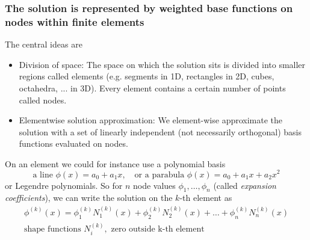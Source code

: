\subsubsection{The solution is represented by weighted base functions on nodes within finite elements}
The central ideas are
\begin{itemize}
    \item \textcolor{blue1}{Division of space:} The space on which the solution sits is divided into smaller regions called elements (e.g. segments in 1D, rectangles in 2D, cubes, octahedra, ... in 3D).  Every element contains a certain number of points called nodes.
    \item \textcolor{blue1}{Elementwise solution approximation:} We element-wise approximate the solution with a set of linearly independent (not necessarily orthogonal) basis functions evaluated on nodes.
\end{itemize}
On an element we could for instance use a polynomial basis
\begin{equation}
    \text{a line } \phi(x) = a_0 + a_1 x, \quad \text{or a parabula } \phi(x) = a_0 + a_1 x + a_2 x^2
\end{equation}
or Legendre polynomials.
So for $n$ node values $\phi_1,\dots,\phi_n$ (called \textit{expansion coefficients}), we can write the solution on the $k$-th element as
\begin{equation}
    \begin{gathered}
        \phi^{(k)}(x) = \phi_1^{(k)} N_1^{(k)}(x) + \phi_2^{(k)} N_2^{(k)}(x) + \dots + \phi_n^{(k)} N_n^{(k)}(x) \\
        \text{shape functions } N_i^{(k)}, \text{ zero outside k-th element}
    \end{gathered}
\end{equation}


